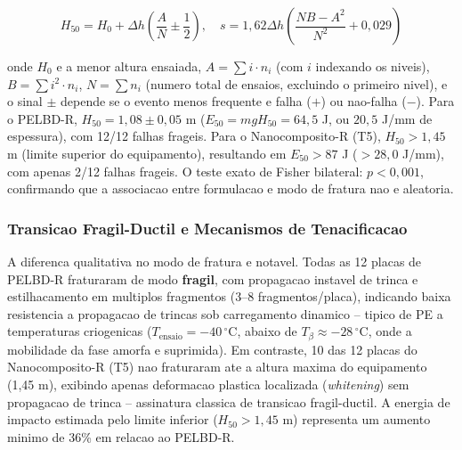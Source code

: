 \documentclass[11pt,a4paper,oneside]{article}
\begin{document}
\begin{equation}
H_{50} = H_0 + \Delta h\left(\frac{A}{N} \pm \frac{1}{2}\right),\quad s = 1{,}62\Delta h\left(\frac{NB - A^2}{N^2} + 0{,}029\right)
\label{eq:dixon_mood}
\end{equation}

onde $H_0$ e a menor altura ensaiada, $A{=}\sum i{\cdot}n_i$ (com $i$ indexando os niveis), $B{=}\sum i^2{\cdot}n_i$, $N{=}\sum n_i$ (numero total de ensaios, excluindo o primeiro nivel), e o sinal $\pm$ depende se o evento menos frequente e falha ($+$) ou nao-falha ($-$). Para o PELBD-R, $H_{50}{=}1{,}08{\pm}0{,}05$ m ($E_{50}{=}mgH_{50}{=}64{,}5$ J, ou $20{,}5$ J/mm de espessura), com 12/12 falhas frageis. Para o Nanocomposito-R (T5), $H_{50}{>}1{,}45$ m (limite superior do equipamento), resultando em $E_{50}{>}87$ J ($>28{,}0$ J/mm), com apenas 2/12 falhas frageis. O teste exato de Fisher bilateral: $p{<}0{,}001$, confirmando que a associacao entre formulacao e modo de fratura nao e aleatoria.

\subsubsection{Transicao Fragil-Ductil e Mecanismos de Tenacificacao}

A diferenca qualitativa no modo de fratura e notavel. Todas as 12 placas de PELBD-R fraturaram de modo {\bfseries fragil}, com propagacao instavel de trinca e estilhacamento em multiplos fragmentos (3--8 fragmentos/placa), indicando baixa resistencia a propagacao de trincas sob carregamento dinamico -- tipico de PE a temperaturas criogenicas ($T_{\text{ensaio}}{=}{-}40\,^{\circ}$C, abaixo de $T_\beta{\approx}{-}28\,^{\circ}$C, onde a mobilidade da fase amorfa e suprimida). Em contraste, 10 das 12 placas do Nanocomposito-R (T5) nao fraturaram ate a altura maxima do equipamento (1,45 m), exibindo apenas deformacao plastica localizada (\textit{whitening}) sem propagacao de trinca -- assinatura classica de transicao fragil-ductil. A energia de impacto estimada pelo limite inferior ($H_{50}{>}1{,}45$ m) representa um aumento minimo de 36\% em relacao ao PELBD-R.
\end{document}
